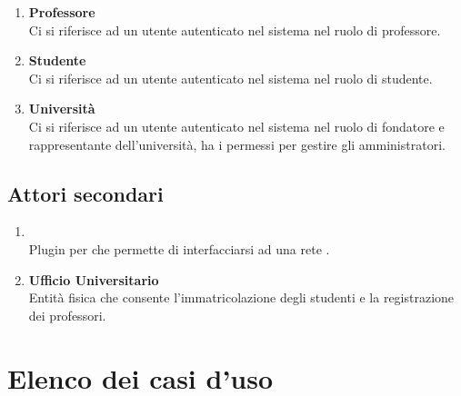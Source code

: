 \documentclass[AnalisiDeiRequisiti.tex]{subfiles}
\begin{document}
\begin{enumerate}
	\item \textbf{Professore}\\
	Ci si riferisce ad un utente autenticato nel sistema nel ruolo di professore.\\
	
	\item \textbf{Studente}\\
	Ci si riferisce ad un utente autenticato nel sistema nel ruolo di studente.\\
		
	\item \textbf{Università}\\
	Ci si riferisce ad un utente autenticato nel sistema nel ruolo di fondatore e rappresentante dell'università, ha i permessi per gestire gli amministratori.\\	
\end{enumerate}

\subsection{Attori secondari}
\begin{enumerate}
	\item \textbf{}\\
	Plugin per  che permette di interfacciarsi ad una rete .\\
	
	\item \textbf{Ufficio Universitario}\\
	Entità fisica che consente l'immatricolazione degli studenti e la registrazione dei professori.\\
\end{enumerate}

\section{Elenco dei casi d'uso}
\end{document}
